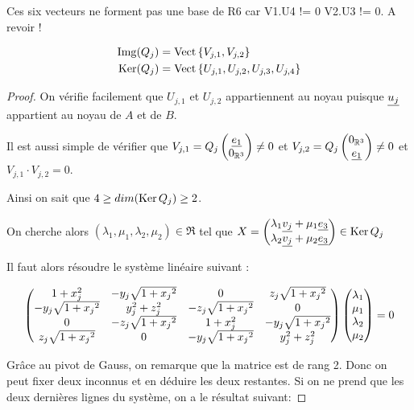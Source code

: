 {
\color{red}
Ces six vecteurs ne forment pas une base de R6 car V1.U4 != 0 V2.U3 != 0. A revoir !
}

\begin{prop}
  \begin{align*}
    \operatorname{Img}(Q_j) &= \operatorname{Vect}\left\lbrace V_{j,1},V_{j,2}\right\rbrace \\
    \operatorname{Ker}(Q_j) &= \operatorname{Vect}\left\lbrace U_{j,1},U_{j,2},U_{j,3},U_{j,4}\right\rbrace
  \end{align*}
\end{prop}

\begin{proof}


On vérifie facilement que $U_{j,1}$ et $U_{j,2}$ appartiennent au noyau puisque $\underline{u_j}$ appartient au noyau de $A$ et de $B$.

Il est aussi simple de vérifier que $V_{j,1} = Q_j\begin{pmatrix}\underline{e_1}\\0_{\mathbb R^3}\end{pmatrix}\not =0$ et $V_{j,2} = Q_j\begin{pmatrix}0_{\mathbb R^3}\\\underline{e_1}\end{pmatrix} \not= 0$ et $V_{j,1}\cdot V_{j,2} = 0$.

Ainsi on sait que $4 \ge dim(\operatorname{Ker} Q_j) \ge 2$.

On cherche alors $(\lambda_1,\mu_1,\lambda_2, \mu_2)\in\Re$ tel que $X = \begin{pmatrix} \lambda_1 \underline{v_j} + \mu_1 \underline{e_3}\\ \lambda_2 \underline{v_j} + \mu_2 \underline{e_3}\end{pmatrix}\in \operatorname{Ker} Q_j$

Il faut alors résoudre le système linéaire suivant :

\[
\begin{pmatrix}
 1+x_j^2 & -y_j \sqrt{1+{x_j}^2} & 0 & z_j\sqrt{1+{x_j}^2} \\
 -y_j\sqrt{1+{x_j}^2} & y_j^2 + z_j^2 & -z_j\sqrt{1+{x_j}^2} & 0 \\
0 & -z_j \sqrt{1+{x_j}^2} & 1 +x_j^2 & -y_j \sqrt{1+{x_j}^2} \\
z_j\sqrt{1+{x_j}^2} & 0 & -y_j\sqrt{1+{x_j}^2} & y_j^2 + z_j^2
\end{pmatrix}
\begin{pmatrix}
  \lambda_1\\
  \mu_1\\
  \lambda_2\\
  \mu_2
\end{pmatrix} = 0
\]

Grâce au pivot de Gauss, on remarque que la matrice est de rang 2. Donc on peut fixer deux inconnus et en déduire les deux restantes. Si on ne prend que les deux dernières lignes du système, on a le résultat suivant:


\end{proof}
